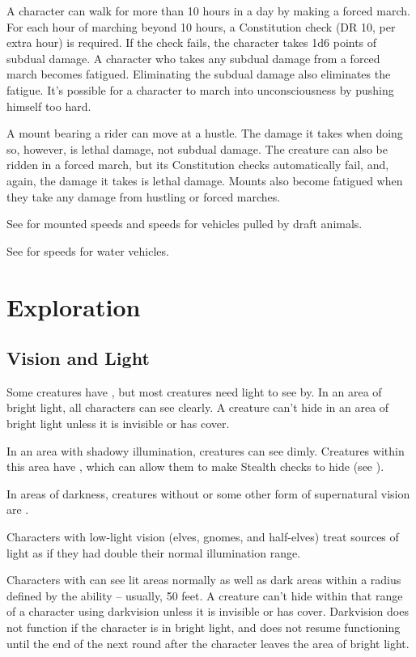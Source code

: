         A character can walk for more than 10 hours in a day by making a forced march. For each hour of marching beyond 10 hours, a Constitution check (DR 10,  per extra hour) is required. If the check fails, the character takes 1d6 points of subdual damage. A character who takes any subdual damage from a forced march becomes fatigued. Eliminating the subdual damage also eliminates the fatigue. It's possible for a character to march into unconsciousness by pushing himself too hard.

         A mount bearing a rider can move at a hustle. The damage it takes when doing so, however, is lethal damage, not subdual damage. The creature can also be ridden in a forced march, but its Constitution checks automatically fail, and, again, the damage it takes is lethal damage. Mounts also become fatigued when they take any damage from hustling or forced marches.

        See  for mounted speeds and speeds for vehicles pulled by draft animals.

         See  for speeds for water vehicles.

\section{Exploration}
    \subsection{Vision and Light}
        Some creatures have , but most creatures need light to see by. 
        In an area of bright light, all characters can see clearly. A creature can't hide in an area of bright light unless it is invisible or has cover.

        In an area with shadowy illumination, creatures can see dimly.
        Creatures within this area have \concealment, which can allow them to make Stealth checks to hide (see ).

        In areas of darkness, creatures without  or some other form of supernatural vision are \blinded.

        Characters with low-light vision (elves, gnomes, and half-elves) treat sources of light as if they had double their normal illumination range.

        Characters with  can see lit areas normally as well as dark areas within a radius defined by the ability -- usually, 50 feet. A creature can't hide within that range of a character using darkvision unless it is invisible or has cover. Darkvision does not function if the character is in bright light, and does not resume functioning until the end of the next round after the character leaves the area of bright light.

